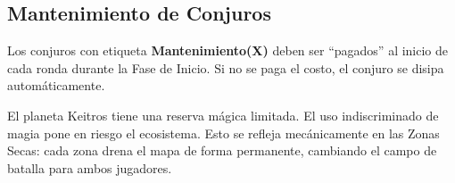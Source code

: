 \vspace{0.3cm}

\subsection*{Mantenimiento de Conjuros}

Los conjuros con etiqueta \textbf{Mantenimiento(X)} deben ser ``pagados'' al inicio de cada ronda durante la Fase de Inicio. Si no se paga el costo, el conjuro se disipa automáticamente.

\begin{tcolorbox}[colback=HammerRed!8, colframe=HammerRed, title=\textbf{IMPORTANTE: La Magia no es Infinita}]
\small El planeta Keitros tiene una reserva mágica limitada. El uso indiscriminado de magia pone en riesgo el ecosistema. Esto se refleja mecánicamente en las Zonas Secas: cada zona drena el mapa de forma permanente, cambiando el campo de batalla para ambos jugadores.
\end{tcolorbox}

